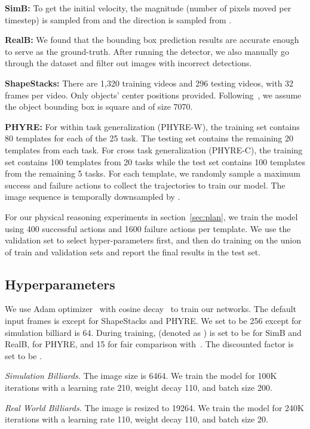 \documentclass{article} \usepackage{iclr2021_conference,times}
\begin{document}
\textbf{SimB:} To get the initial velocity, the magnitude (number of pixels moved per timestep) is sampled from  and the direction is sampled from .

\textbf{RealB:} We found that the bounding box prediction results are accurate enough to serve as the ground-truth. After running the detector, we also manually go through the dataset and filter out images with incorrect detections.

\textbf{ShapeStacks:} There are 1,320 training videos and 296 testing videos, with 32 frames per video. Only objects' center positions provided. Following~\citep{ye2019cvp}, we assume the object bounding box is square and of size 7070.

\textbf{PHYRE:} For within task generalization (PHYRE-W), the training set contains 80 templates for each of the 25 task. The testing set contains the remaining 20 templates from each task. For cross task generalization (PHYRE-C), the training set contains 100 templates from 20 tasks while the test set contains 100 templates from the remaining 5 tasks. For each template, we randomly sample a maximum  success and  failure actions to collect the trajectories to train our model. The image sequence is temporally downsampled by . 

For our physical reasoning experiments in section~\ref{sec:plan}, we train the model using 400 successful actions and 1600 failure actions per template. We use the validation set to select hyper-parameters first, and then do training on the union of train and validation sets and report the final results in the test set.

\subsection{Hyperparameters}
We use Adam optimizer~\cite{kingma2014adam} with cosine decay~\cite{loshchilov2016sgdr} to train our networks. The default input frames is  except  for ShapeStacks and PHYRE. We set  to be 256 except for simulation billiard  is 64. During training,  (denoted as ) is set to be  for SimB and RealB,  for PHYRE, and 15 for fair comparison with~\cite{ye2019cvp}. The discounted factor  is set to be .

\textit{Simulation Billiards.} The image size is 6464. We train the model for 100K iterations with a learning rate 210, weight decay 110, and batch size 200.

\textit{Real World Billiards.} The image is resized to 19264. We train the model for 240K iterations with a learning rate 110, weight decay 110, and batch size 20.
\end{document}
